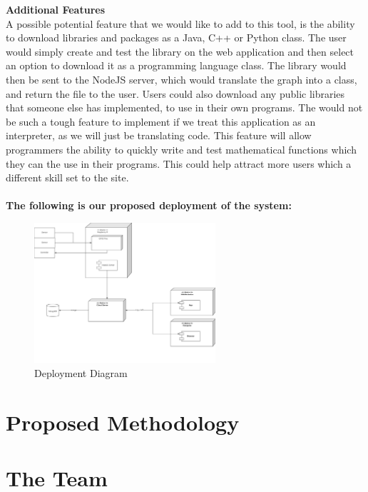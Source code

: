 \documentclass[12pt]{article}
\begin{document}
	\textbf{Additional Features}\\
    A possible potential feature that we would like to add to this tool, is the ability to download libraries and packages as a Java, C++ or Python class. The user would simply create and test the library on the web application and then select an option to download it as a programming
    language class. The library would then be sent to the NodeJS server, which would translate the graph into a class, and return the file to 
    the user. Users could also download any public libraries that someone else has implemented, to use in their own programs. The would not be 
    such a tough feature to implement if we treat this application as an interpreter, as we will just be translating code. This feature will 
    allow programmers the ability to quickly write and test mathematical functions which they can the use in their programs. This could help 
    attract more users which a different skill set to the site. \\
    \\
    \textbf{The following is our proposed deployment of the system:}
\setlength{\fboxsep}{15pt}
	\begin{figure}[htb]
	\centering
	\includegraphics[width=0.6\textwidth]{deployment.png}
	\caption{Deployment Diagram}
	\end{figure}

	\newpage
	\section{Proposed Methodology}
	
	\newpage
	\section{The Team}
	
	\newpage
\end{document}
